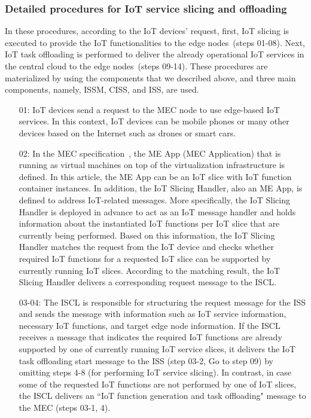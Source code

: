 \subsubsection{Detailed procedures for IoT service slicing and offloading} In these procedures, according to the IoT devices' request, first, IoT slicing is executed to provide the IoT functionalities to the edge nodes~(steps 01-08). Next, IoT task offloading is performed to deliver the already operational IoT services in the central cloud to the edge nodes~(steps 09-14). These procedures are materialized by using the components that we described above, and three main components, namely, ISSM, CISS, and ISS, are used.

\begin{enumerate}
\item [01:] IoT devices send a request to the MEC node to use edge-based IoT services. In this context, IoT devices can be mobile phones or many other devices based on the Internet such as drones or smart cars.

\item [02:] In the MEC specification~\cite{computing2019framework}, the ME App (MEC Application) that is running as virtual machines on top of the virtualization infrastructure is defined. In this article, the ME App can be an IoT slice with IoT function container instances. In addition, the IoT Slicing Handler, also an ME App, is defined to address IoT-related messages. More specifically, the IoT Slicing Handler is deployed in advance to act as an IoT message handler and holds information about the instantiated IoT functions per IoT slice that are currently being performed. Based on this information, the IoT Slicing Handler matches the request from the IoT device and checks whether required IoT functions for a requested IoT slice can be supported by currently running IoT slices. According to the matching result, the IoT Slicing Handler delivers a corresponding request message to the ISCL.

\item [03-04:] The ISCL is responsible for structuring the request message for the ISS and sends the message with information such as IoT service information, necessary IoT functions, and target edge node information. 
If the ISCL receives a message that indicates the required IoT functions are already supported by one of currently running IoT service slices, it delivers the IoT task offloading start message to the ISS (step 03-2, Go to step 09) by omitting steps 4-8 (for performing IoT service slicing). 
In contrast, in case some of the requested IoT functions are not performed by one of IoT slices, the ISCL delivers an ``IoT function generation and task offloading" message to the MEC (steps 03-1, 4).


\end{enumerate}
